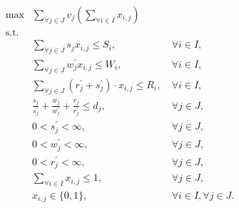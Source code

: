 \begin{align}
    \max & \sum_{\forall j \in J} v_j \left(\sum_{\forall i \in I} x_{i,j}\right)\label{eq:objective}\\
    \mbox{s.t.} \nonumber \\
    & \sum_{\forall j \in J} s_j x_{i,j} \leq S_i, &~ \forall i \in I,\label{eq:server_storage_constraint}\\
    & \sum_{\forall j \in J} w^{'}_j x_{i,j} \leq W_i, &~ \forall i \in I,\label{eq:server_computation_constraint}\\
    & \sum_{\forall j \in J} (r^{'}_j + s^{'}_j) \cdot x_{i,j} \leq R_i, &~ \forall i \in I,\label{eq:server_communication_constraint}\\
    & \frac{s_j}{s^{'}_j} + \frac{w_j}{w^{'}_j} + \frac{r_j}{r^{'}_j} \leq d_j, &~ \forall{j \in J},\label{eq:task_deadline}\\
    & 0 < s^{'}_j < \infty, &~ \forall{j \in J,}\label{eq:loading_speeds}\\
    & 0 < w^{'}_j < \infty, &~ \forall{j \in J,}\label{eq:compute_speeds}\\
    & 0 < r^{'}_j < \infty, &~ \forall{j \in J,}\label{eq:sending_speeds}\\
    & \sum_{\forall i \in I} x_{i,j} \leq 1, &~ \forall j \in J,\label{eq:server_task_allocation}\\
    & x_{i,j} \in \{0, 1\}, &~ \forall{i \in I},\forall{j \in J}.\label{eq:task_allocation}
\end{align}

